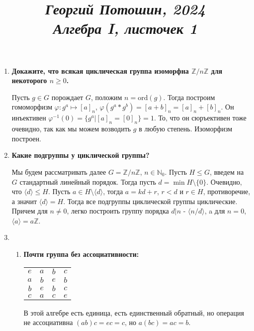 \documentclass{article}
\title{
\textit{\small{Георгий Потошин, 2024}}\\
\vspace{0.3ex}
\textit{\huge{Алгебра I, листочек 1}}\vspace{1ex}
}
\date{\vspace{-10ex}}
\begin{document}
\maketitle

\begin{enumerate}
    \item \textbf{Докажите, что всякая циклическая группа изоморфна
        $\mathbb{Z}/n\mathbb{Z}$ для некоторого $n\geq 0$.}\par
        Пусть $g\in G$ порождает $G$, положим $n=\text{ord}(g)$. Тогда построим
        гомоморфизм $\varphi:g^a \mapsto [a]_n$, $\varphi(g^a*g^b)=[a+b]_n=[a]_n+[b]_n$. Он
        инъективен $\varphi^{-1}(0) = \{g^a|[a]_n=[0]_n\} = 1$. То, что он
        сюръективен тоже очевидно, так как мы можем возводить $g$ в любую
        степень. Изоморфизм построен.

    \item \textbf{Какие подгруппы у циклической группы?}\par
        Мы будем рассматривать далее $G=\mathbb{Z}/n\mathbb{Z}$, $n\in\mathbb{N}_0$.
        Пусть $H\leq G$, введем на $G$ стандартный линейный порядок. Тогда
        пусть $d =\min H\setminus\{0\}$. Очевидно, что $\langle d\rangle\leq H$. Пусть
        $a\in H\setminus\langle d\rangle$, тогда $a=kd+r$, $r<d$ и $r\in H$,
        противоречие, а значит $\langle d\rangle=H$. Тогда все подгруппы 
        циклической группы циклические. Причем для $n\neq 0$, легко построить
        группу порядка $d|n$ - $\langle n/d\rangle$, a для $n=0$, $\langle
        a\rangle = a\mathbb{Z}$.

    \item
        \begin{enumerate}
            \item \textbf{Почти группа без ассоциативности:}\\
                \begin{center}
                \noindent\begin{tabular}{c | c c c}
                    $e$ & $a$ & $b$ & $c$  \\
                    \cline{1-4}
                    $a$ & $b$ & $e$ & $b$ \\
                    $b$ & $e$ & $b$ & $c$ \\
                    $c$ & $a$ & $c$ & $e$ \\
                \end{tabular}
                \end{center}
                В этой алгебре есть единица, есть единственный обратный, но операция
                не ассоциативна $(ab)c=ec=c$, но $a(bc)=ac=b$.


\end{enumerate}
\end{enumerate}
\end{document}

